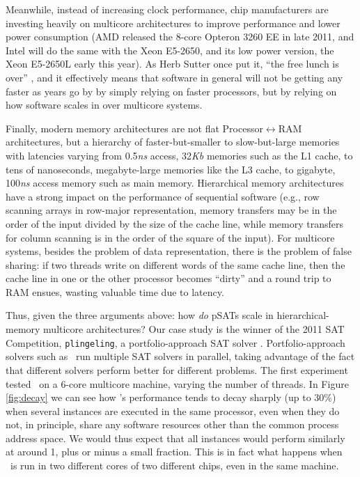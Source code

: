 \documentclass{llncs}
\begin{document}
Meanwhile, instead of increasing clock performance, chip manufacturers
are investing heavily on multicore architectures to improve
performance and lower power consumption (AMD released the 8-core
Opteron 3260 EE in late 2011, and Intel will do the same with the Xeon
E5-2650, and its low power version, the Xeon E5-2650L early this
year). As Herb Sutter once put it, ``the free lunch is over''
\cite{FreeLunchIsOver}, and it effectively means that software in
general will not be getting any faster as years go by by simply
relying on faster processors, but by relying on how software scales in
over multicore systems.

Finally, modern memory architectures are not flat
Processor$\leftrightarrow$RAM architectures, but a hierarchy of
faster-but-smaller to slow-but-large memories with latencies varying
from 0.5{\it ns} access, 32{\it Kb} memories such as the L1 cache, to
tens of nanoseconds, megabyte-large memories like the L3 cache, to
gigabyte, 100{\it ns} access memory such as main memory. Hierarchical
memory architectures have a strong impact on the performance of
sequential software (e.g., row scanning arrays in row-major
representation, memory transfers may be in the order of the input
divided by the size of the cache line, while memory transfers for
column scanning is in the order of the square of the input). For
multicore systems, besides the problem of data representation, there
is the problem of false sharing: if two threads write on different
words of the same cache line, then the cache line in one or the other
processor becomes ``dirty'' and a round trip to RAM ensues, wasting
valuable time due to latency.

Thus, given the three arguments above: how {\em do} pSATs scale in
hierarchical-memory multicore architectures? Our case study is the
winner of the 2011 SAT Competition, {\tt plingeling}, a
portfolio-approach SAT solver \cite{lingeling}. Portfolio-approach
solvers such as \pling\ run multiple SAT solvers in parallel, taking
advantage of the fact that different solvers perform better for
different problems. The first experiment tested \pling\ on a 6-core
multicore machine, varying the number of threads. In Figure
\ref{fig:decay} we can see how \pling's performance tends to decay
sharply (up to 30\%) when several instances are executed in the same
processor, even when they do not, in principle, share any software
resources other than the common process address space. We would thus
expect that all instances would perform similarly at around 1, plus or
minus a small fraction. This is in fact what happens when \pling\ is
run in two different cores of two different chips, even in the same
machine.
\end{document}
